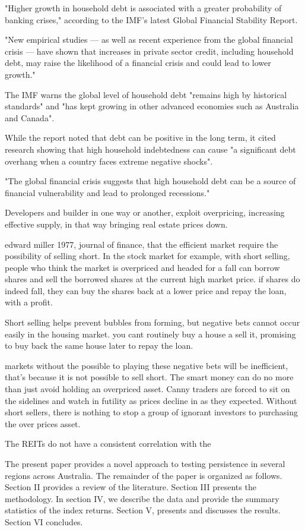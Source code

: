 \documentclass[AEJ,reqno, draftmode]{AEA}
\begin{document}
"Higher growth in household debt is associated with a greater probability of banking crises," according to the IMF's latest Global Financial Stability Report.

"New empirical studies — as well as recent experience from the global financial crisis — have shown that increases in private sector credit, including household debt, may raise the likelihood of a financial crisis and could lead to lower growth."

The IMF warns the global level of household debt "remains high by historical standards" and "has kept growing in other advanced economies such as Australia and Canada".

While the report noted that debt can be positive in the long term, it cited research showing that high household indebtedness can cause "a significant debt overhang when a country faces extreme negative shocks".

"The global financial crisis suggests that high household debt can be a source of financial vulnerability and lead to prolonged recessions."

Developers and builder in one way or another, exploit overpricing, increasing effective supply, in that way bringing real estate prices down.

edward miller 1977, journal of finance, that the efficient market require the possibility of selling short. In the stock market for example, with short selling, people who think the market is overpriced and headed for a fall can borrow shares and sell the borrowed shares at the current high market price. if shares do indeed fall, they can buy the shares back at a lower price and repay the loan, with a profit.

Short selling helps prevent bubbles from forming, but negative bets cannot occur easily in the housing market. you cant routinely buy a house a sell it, promising to buy back the same house later to repay the loan.

markets without the possible to playing these negative bets will be inefficient, that's because it is not possible to sell short. The smart money can do no more than just avoid holding an overpriced asset. Canny traders are forced to sit on the sidelines and watch in futility as prices decline in as they expected. Without short sellers, there is nothing to stop a group of ignorant investors to purchasing the over prices asset.

The REITs do not have a consistent correlation with the 


The present paper provides a novel approach to testing persistence in several regions across Australia. The remainder of the paper is organized as follows. Section II provides a review of the literature. Section III presents the methodology. In section IV, we describe the data and provide the summary statistics of the index returns. Section V, presents and discusses the results. Section VI concludes.
\end{document}
